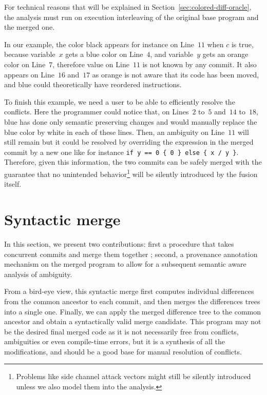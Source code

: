 \documentclass[a4paper,11pt]{article}
\begin{document}
For technical reasons that will be explained in Section~\ref{sec:colored-diff-oracle}, the analysis must run on execution interleaving of the original base program and the merged one.

In our example, the color black appears for instance on Line~$11$ when $c$ is true, because variable~$x$ gets a blue color on Line~$4$, and variable~$y$ gets an orange color on Line~$7$, therefore value on
Line~$11$ is not known by any commit. It also appears on Line~$16$
and~$17$ as orange is not aware that its code has been moved, and blue could theoretically have reordered instructions.

To finish this example, we need a user to be able to efficiently
resolve the conflicts. Here the programmer could notice that, on
Lines~$2$ to~$5$ and~$14$ to~$18$, blue has done only semantic
preserving changes and would manually replace the blue color by white
in each of these lines. Then, an ambiguity on Line~$11$ will still
remain but it could be resolved by overriding the expression in the
merged commit by a new one like for instance
\lstinline$if y == 0 { 0 } else { x / y }$.
Therefore, given this information, the two commits
can be safely merged with the guarantee that no unintended
behavior\footnote{Problems like side channel attack vectors might still be silently introduced unless we also model them into the analysis.} will be silently introduced by the fusion itself.

\section{Syntactic merge}
\label{sec:syntactic-merge}

In this section, we present two contributions: first a procedure that
takes concurrent commits and merge them together ; second, a
provenance annotation mechanism on the merged program to allow for a
subsequent semantic aware analysis of ambiguity.

From a bird-eye view, this syntactic merge first computes individual
differences from the common ancestor to each commit, and then merges
the differences trees into a single one. Finally, we can apply the
merged difference tree to the common ancestor and obtain a
syntactically valid merge candidate. This program may not be the
desired final merged code as it is not necessarily free
from conflicts, ambiguities or even compile-time errors, but it is a synthesis of all the modifications, and should be a good base for manual resolution of conflicts.
\end{document}

